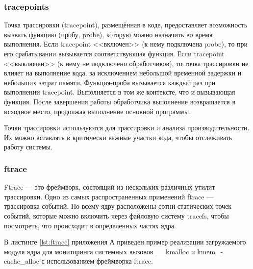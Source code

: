 \subsubsection*{tracepoints}

Точка трассировки (tracepoint), размещённая в коде, предоставляет возможность вызвать функцию (пробу, probe), которую можно назначить во время выполнения.
Если tracepoint <<включен>> (к нему подключена probe), то при его срабатывании вызывается соответствующая функция.
Если tracepoint <<выключен>> (к нему не подключено обработчиков), то точка трассировки не влияет на выполнение кода, за исключением небольшой временной задержки и небольших затрат памяти.
Функция-проба вызывается каждый раз при выполнении tracepoint.
Выполняется в том же контексте, что и вызывающая функция.
После завершения работы обработчика выполнение возвращается в исходное место, продолжая выполнение основной программы.

Точки трассировки используются для трассировки и анализа производительности.
Их можно вставлять в критически важные участки кода, чтобы отслеживать работу системы.~\cite{tracepoints}


\subsubsection*{ftrace}

Ftrace --- это фреймворк, состоящий из нескольких различных утилит трассировки.
Одно из самых распространенных применений ftrace --- трассировка событий.
По всему ядру расположены сотни статических точек событий, которые можно включить через файловую систему tracefs, чтобы посмотреть, что происходит в определенных частях ядра.~\cite{ftrace}

В листинге \ref{lst:ftrace} приложения А приведен пример реализации загружаемого модуля ядра для мониторинга системных вызовов \_\_kmalloc и kmem\_-cache\_alloc с использованием фреймворка ftrace.


%
%

